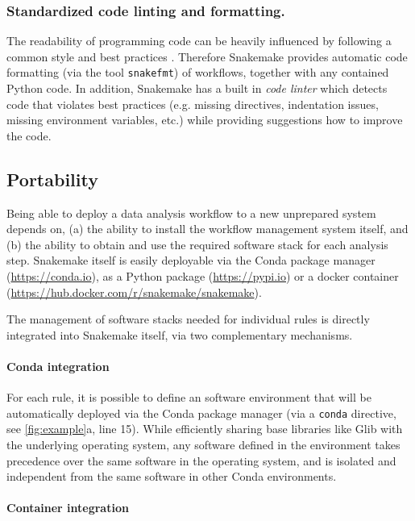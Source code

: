 \documentclass[parskip=half]{scrartcl}
\let\plainurl\url
\renewcommand{\url}[1]{\protect\plainurl{#1}}
\begin{document}
\subsubsection{Standardized code linting and formatting.}

The readability of programming code can be heavily influenced by following a common style and best practices \parencite{tysell_sundkvist_code_2017}.
Therefore Snakemake provides automatic code formatting (via the tool \lstinline!snakefmt!) of workflows, together with any contained Python code.
In addition, Snakemake has a built in \emph{code linter} which detects code that violates best practices (e.g. missing directives, indentation issues, missing environment variables, etc.) while providing suggestions how to improve the code.

\subsection{Portability}\label{sec:portability}

Being able to deploy a data analysis workflow to a new unprepared system depends on, (a) the ability to install the workflow management system itself, and (b) the ability to obtain and use the required software stack for each analysis step.
Snakemake itself is easily deployable via the Conda package manager (\url{https://conda.io}), as a Python package (\url{https://pypi.io}) or a docker container (\url{https://hub.docker.com/r/snakemake/snakemake}).

The management of software stacks needed for individual rules is directly integrated into Snakemake itself, via two complementary mechanisms.

\paragraph{Conda integration}

For each rule, it is possible to define an software environment that will be automatically deployed via the Conda package manager (via a \lstinline!conda! directive, see \autoref{fig:example}a, line 15).
While efficiently sharing base libraries like Glib with the underlying operating system, any software defined in the environment takes precedence over the same software in the operating system, and is isolated and independent from the same software in other Conda environments.

\paragraph{Container integration}
\end{document}
